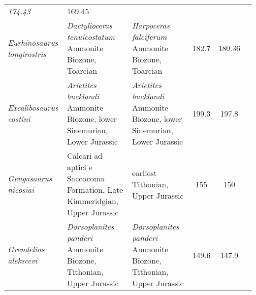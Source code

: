 \begin{longtabu}{>{\itshape}lXXSSl}
            174.43                   & 169.45                   &
            \cite{Brusatte2015SJG} \\                   
	Eurhinosaurus longirostris                           &
        \emph{Dactylioceras tenuicostatum} Ammonite Biozone, Toarcian
                                                             & \emph{Harpoceras
    falciferum} Ammonite Biozone, Toarcian
                                                             & 182.7
                                                             & 180.36
                                                             &
                                                             \cite{vonHuene1951NJGPA,McGowan1986N} \\          
	Excalibosaurus costini                               & \emph{Arietites
        bucklandi} Ammonite Biozone, lower Sinemurian, Lower Jurassic
                                                             & \emph{Arietites
        bucklandi} Ammonite Biozone, lower Sinemurian, Lower Jurassic
                                                             & 199.3
                                                             & 197.8
                                                             &
                                                             \cite{McGowan2003JVP,McGowan1986N} \\        
	Gengasaurus nicosiai                                 & Calcari ad aptici
        e Saccocoma Formation, Late Kimmeridgian, Upper Jurassic
                                                             & earliest
        Tithonian, Upper Jurassic
                                                             & 155
                                                             & 150
                                                             &
                                                             \cite{Paparella2016GM} \\                  
	Grendelius alekseevi                                 &
        \emph{Dorsoplanites panderi} Ammonite Biozone, Tithonian, Upper Jurassic
                                                             &
        \emph{Dorsoplanites panderi} Ammonite Biozone, Tithonian, Upper Jurassic
                                                             & 149.6
                                                             & 147.9
                                                             &
                                                             \cite{Arkhangelsky2001PJ} \\               

\end{longtabu}
